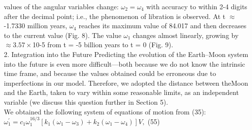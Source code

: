 \documentclass[fontsize = 11pt,a4paper]{article}
\begin{document}
\begin{multicols}{2}
values of the angular variables change: $\omega_2 = \omega_4$ with
accuracy to within 2-4 digits after the decimal point;
i.e., the phenomenon of libration is observed. At
t $\approx$ -1.7330 million years, $\omega_4$ reaches its maximum
value of 84.017 and then decreases to the current
value (Fig. 8). The value $\omega_1$ changes almost linearly,
growing by$\approx 3.57 \times $10-5 from t = -5 billion years to
t = 0 (Fig. 9).\\
2. Integration into the Future Predicting the evolution
of the Earth–Moon system into the future is
even more difficult—both because we do not know the
intrinsic time frame, and because the values obtained
could be erroneous due to imperfections in our model.
Therefore, we adopted the distance between theMoon
and the Earth, taken to vary within some reasonable
limits, as an independent variable (we discuss this
question further in Section 5). \\
\indent We obtained the following system of equations of
motion from (35): \\
$\omega_1^{\prime} = c_1 \omega^{16/3}_1 [k_1(\omega_1 - \omega_3) + k_2(\omega_1 - \omega_4)]V,$ \hfill (55)
\end{multicols}
\pagebreak
\end{document}
